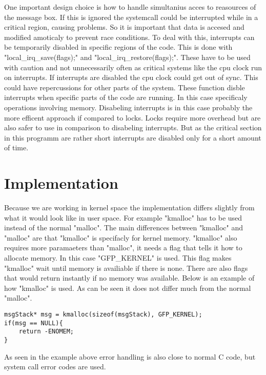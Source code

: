 \documentclass[12pt,a4paper]{report}
\begin{document}
One important design choice is how to handle simultanius acces to reasources of the message box. If this is ignored the systemcall could be interrupted while in a critical region, causing problems. So it is important that data is accesed and modified amoticaly to prevent race conditions. To deal with this, interrupts can be temporarily disabled in specific regions of the code. This is done with "local\_irq\_save(flags);" and "local\_irq\_restore(flags);". These have to be used with caution and not unnecessarily often as critical systems like the cpu clock run on interrupts. If interrupts are disabled the cpu clock could get out of sync. This could have repercussions for other parts of the system. These function disble interrupts when specific parts of the code are running. In this case specificaly operations involving memory. Disabeling interrupts is in this case probably the more efficent approach if compared to locks. Locks require more overhead but are also safer to use in comparison to disabeling interrupts. But as the critical section in this programm are rather short interrupts are disabled only for a short amount of time.

\section{Implementation}
Because we are working in kernel space the implementation differs slightly from what it would look like in user space. For example "kmalloc" has to be used instead of the normal "malloc". The main differences between "kmalloc" and "malloc" are that "kmalloc" is specifacly for kernel memory. "kmalloc" also requires more paramaeters than "malloc", it needs a flag that tells it how to allocate memory. In this case "GFP\_KERNEL" is used. This flag makes "kmalloc" wait until memory is availiable if there is none. There are also flags that would return instantly if no memory was available. Below is an example of how "kmalloc" is used. As can be seen it does not differ much from the normal "malloc".
\begin{verbatim}
msgStack* msg = kmalloc(sizeof(msgStack), GFP_KERNEL);
if(msg == NULL){
    return -ENOMEM;
}
\end{verbatim}
As seen in the example above error handling is also close to normal C code, but system call error codes are used.
\end{document}
